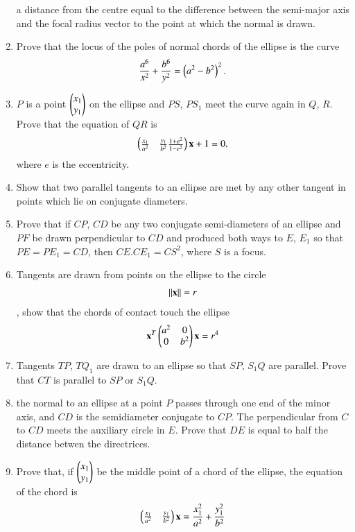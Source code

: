 \begin{enumerate}[label=\arabic*.,ref=\thesubsection.\theenumi]
a distance from the centre equal to the difference between the semi-major axis and the focal
radius vector to the point at which the normal is drawn.
\item Prove that the locus of the poles of normal chords of the ellipse is the curve
\begin{align}
\frac{a^6}{x^2}+\frac{b^6}{y^2}=\left(a^2-b^2\right)^2.
\end{align}
\item $P$ is a point $\begin{pmatrix}x_1\\y_1\end{pmatrix}$ on the ellipse and $PS$, $PS_1$ meet the curve again in $Q$, $R$.  Prove that
the equation of $QR$ is 
\begin{align}
\begin{pmatrix}\frac{x_1}{a^2} &\frac{y_1}{b^2}\frac{1+e^2}{1-e^2}\end{pmatrix}\mathbf{x} + 1 = 0,
\end{align}
where $e$ is the eccentricity.
\item Show that two parallel tangents to an ellipse are met by any other tangent in points
which lie on conjugate diameters.
\item Prove that if $CP$, $CD$ be any two conjugate semi-diameters of an ellipse and $PF$ be drawn
perpendicular to $CD$ and produced both ways to $E$, $E_1$ so that
$PE=PE_1=CD$, then $CE.CE_1=CS^2$, where $S$ is a focus.
\item Tangents are drawn from points on the ellipse to the circle 
\begin{align}
\left\lVert\mathbf{x}\right\rVert = r
\end{align}
, show that the chords of contact touch
the ellipse
\begin{align}
\mathbf{x}^T\begin{pmatrix}a^2 & 0\\0 & b^2\end{pmatrix}\mathbf{x} =r^4
\end{align}
\item Tangents $TP$, $TQ_1$ are drawn to an ellipse so that $SP$, $S_1Q$ are parallel.  Prove that $CT$ is parallel to $SP$ or $S_1Q$.
\item the normal to an ellipse at a point $P$ passes through one end of the minor axis, and $CD$ is the semidiameter conjugate to $CP$.  The
perpendicular from $C$ to $CD$ meets the auxiliary circle in $E$.  Prove that $DE$ is equal to half the distance
betwen the directrices.
\item Prove that, if $\begin{pmatrix}x_1\\y_1\end{pmatrix}$ be the middle point of a chord of the ellipse, the equation of the chord is
\begin{align}
\myvec{\frac{x_1}{a^2} &\frac{y_1}{b^2}}\vec{x} = \frac{x_1^2}{a^2}+\frac{y_1^2}{b^2}

\end{align}
\end{enumerate}
